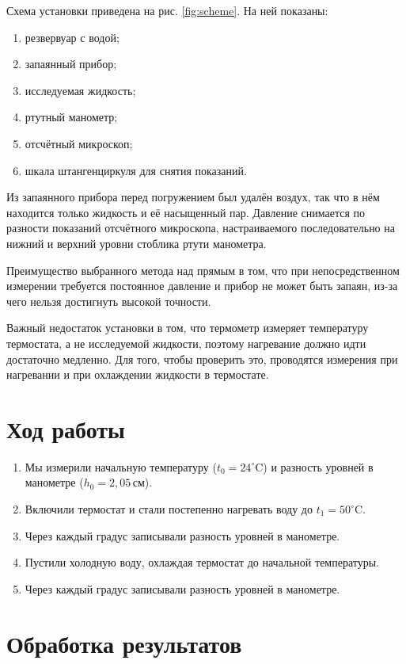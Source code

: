 \documentclass[12pt]{article}
\begin{document}
	Схема установки приведена на рис. \ref{fig:scheme}. На ней показаны:
	\begin{enumerate}
		\addtocounter{enumi}{11}
		\item резвервуар с водой;
		\item запаянный прибор;
		\item исследуемая жидкость;
		\item ртутный манометр;
		\item отсчётный микроскоп;
		\item шкала штангенциркуля для снятия показаний.
	\end{enumerate}
	
	Из запаянного прибора перед погружением был удалён воздух, так что в нём находится только жидкость и её насыщенный пар. Давление снимается по разности показаний отсчётного микроскопа, настраиваемого последовательно на нижний и верхний уровни стоблика ртути манометра.
	
	Преимущество выбранного метода над прямым в том, что при непосредственном измерении требуется постоянное давление и прибор не может быть запаян, из-за чего нельзя достигнуть высокой точности.
	
	Важный недостаток установки в том, что термометр измеряет температуру термостата, а не исследуемой жидкости, поэтому нагревание должно идти достаточно медленно. Для того, чтобы проверить это, проводятся измерения при нагревании и при охлаждении жидкости в термостате.
	
	\section*{Ход работы}
	
	\begin{enumerate}
		\item Мы измерили начальную температуру ($t_0=24 ^\circ \text{C}$) и разность уровней в манометре ($h_0=2{,}05 \,\text{см}$).
		\item Включили термостат и стали постепенно нагревать воду до $t_1=50 ^\circ \text{C}$.
		\item Через каждый градус записывали разность уровней в манометре.
		\item Пустили холодную воду, охлаждая термостат до начальной температуры.
		\item Через каждый градус записывали разность уровней в манометре.
	\end{enumerate}
	
	\section*{Обработка результатов}
	
\end{document}
